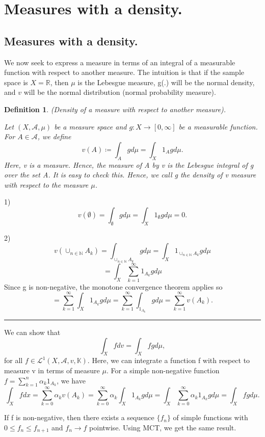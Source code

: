 \documentclass[twoside]{article}
\newtheorem{definition}[theorem]{Definition}
\newenvironment{proof}{{\bf Proof:}}{\hfill\rule{2mm}{2mm}}
\begin{document}
\section{Measures with a density.}
\subsection{Measures with a density.}

We now seek to express a measure in terms of an integral of a measurable function with respect to another measure. The intuition is that if the sample space is $X = \mathbb{R}$, then $\mu$ is the Lebesgue measure, g(.) will be the normal density, and $v$ will be the normal distribution (normal probability measure).

\begin{definition}
(Density of a measure with respect to another measure).

Let $(X, \mathcal{A}, \mu)$ be a measure space and $g: X \rightarrow [0, \infty]$ be a measurable function. For $A \in \mathcal{A}$, we define
$$
v(A) \coloneqq \int_Agd\mu = \int_X1_{A}gd\mu.
$$
Here, v is a measure. Hence, the measure of A by v is the Lebesgue integral of g over the set A. It is easy to check this. Hence, we call g the density of v measure with respect to the measure $\mu$.
\end{definition}

\begin{proof}
1)
$$v(\emptyset) = \int_{\emptyset}gd\mu = \int_X1_{\emptyset}gd\mu = 0.$$

2)
$$
v(\cup_{n \in \mathbb{N}}A_k) = \int_{\cup_{n \in \mathbb{N}}A_k}gd\mu = \int_X1_{\cup_{n \in \mathbb{N}}A_k}gd\mu
$$
$$
= \int_X\sum_{k=1}^{\infty}1_{A_k}gd\mu
$$
Since g is non-negative, the monotone convergence theorem applies so 
$$
= \sum_{k=1}^{\infty}\int_X1_{A_k}gd\mu = \sum_{k=1}^{\infty}\int_{1_{A_k}}gd\mu = \sum_{k=1}^{\infty}v(A_k).
$$
\end{proof}


We can show that
$$
\int_X fdv = \int_Xfgd\mu,
$$
for all $f \in \mathcal{L}^1(X, \mathcal{A}, v, \mathbb{K})$. Here, we can integrate a function f with respect to measure v in terms of measure $\mu$. For a simple non-negative function $f = \sum_{k=1}^n\alpha_k1_{A_k}$, we have
$$
\int_Xfdx = \sum_{k=0}^{\infty}\alpha_kv(A_k) = \sum_{k=0}^{\infty}\alpha_k\int_X1_{A_k}gd\mu = \int_X\sum_{k=0}^{\infty}\alpha_k1_{A_k}gd\mu   = \int_Xfgd\mu.
$$

If f is non-negative, then there exists a sequence $\{f_n\}$ of simple functions with $0 \leq f_n \leq f_{n+1}$ and $f_n \rightarrow f$ pointwise. Using MCT, we get the same result.
\end{document}
